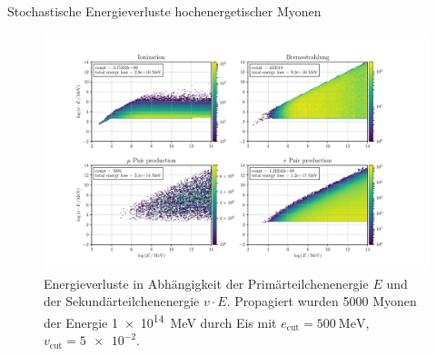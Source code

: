 \documentclass[aspectratio=1610, captions=tableheading, 9pt]{beamer}
\begin{document}
\begin{frame}{Stochastische Energieverluste hochenergetischer Myonen}
\begin{figure}
    \centering
    \includegraphics[height=0.8\textheight]{plots/e_losses_new.pdf}
    \caption{Energieverluste in Abhängigkeit der Primärteilchenenergie $E$ und der Sekundärteilchenenergie $v \cdot E$. Propagiert wurden \num{5000} Myonen der Energie \SI{1e14}{\mega\electronvolt} durch Eis mit $e_\text{cut} = \SI{500}{\mega\electronvolt}$, $v_\text{cut} = \num{5e-2}$.}
    \label{fig:1}
\end{figure}
\end{frame}
\end{document}
